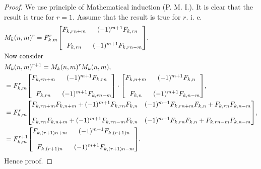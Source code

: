 \begin{proof}
We use principle of Mathematical induction (P. M. I.). It is clear that the result is true for $r=1$. Assume that the result is true for $r$. i. e.
\begin{align*}
&M_{k}(n,m)^r = F_{k,m}^{r}{
          \begin{bmatrix}
            F_{k,rn+m} & (-1)^{m+1}F_{k,rn}\bigskip \\
            F_{k,rn} & (-1)^{m+1}F_{k,rn-m} 
          \end{bmatrix}
     }.\\				
&\text{Now consider}\\
&M_{k}(n,m)^{r+1}= M_{k}(n,m)^{r}M_{k}(n,m),\\
&= F_{k,m}^{r}{
          \begin{bmatrix}
            F_{k,rn+m} & (-1)^{m+1}F_{k,rn} \bigskip\\
            F_{k,rn} & (-1)^{m+1}F_{k,rn-m} 
          \end{bmatrix}
        }\cdot {
          \begin{bmatrix}
            F_{k,n+m} & (-1)^{m+1}F_{k,n}\bigskip \\
            F_{k,n} & (-1)^{m+1}F_{k,n-m} 
          \end{bmatrix}
        },\\
& = F_{k,m}^{r}{
          \begin{bmatrix}
F_{k,rn+m}F_{k,n+m}+(-1)^{m+1}F_{k,rn}F_{k,n} & (-1)^{m+1}F_{k,rn+m}F_{k,n}+F_{k,rn}F_{k,n-m} \bigskip\\
F_{k,rn}F_{k,n+m}+(-1)^{m+1}F_{k,rn-m}F_{k,n} & (-1)^{m+1}F_{k,rn}F_{k,n}+F_{k,rn-m}F_{k,n-m} 
\end{bmatrix}
},\\
&= F_{k,m}^{r+1}{
          \begin{bmatrix}
            F_{k,(r+1)n+m} & (-1)^{m+1}F_{k,(r+1)n} \bigskip\\
            F_{k,(r+1)n} & (-1)^{m+1}F_{k,(r+1)n-m} 
          \end{bmatrix}
        }.
\end{align*}				
Hence proof.
\end{proof}	
